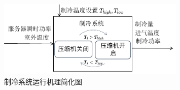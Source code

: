 \begin{figure}[!htbp]
  \centering
  \includegraphics[width=0.8\textwidth]{figures/chapter4/cooling_workloop.pdf}
\caption{制冷系统运行机理简化图}
\label{fig:cooling_workloop} 
\end{figure}


